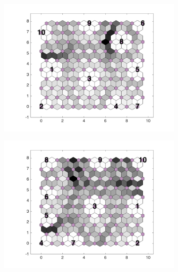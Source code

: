 \begin{figure}
    \begin{subfigure}[b]{0.3\textwidth}
        \centering
        \includegraphics[width=\textwidth]{../../images0.01/M31/2D/diff_dimension/combine_2D_data_between_cols3and11.png}
        \label{fig: col3and11_dist}
    \end{subfigure}
    \hfill
    \begin{subfigure}[b]{0.3\textwidth}
        \centering
        \includegraphics[width=\textwidth]{../../images0.01/M31/2D/diff_dimension/combine_2D_data_between_cols3and12.png}
        \label{fig: col3and12_dist}
    \end{subfigure}
        \hfill
    \begin{subfigure}[b]{0.3\textwidth}

\end{subfigure}
\end{figure}
